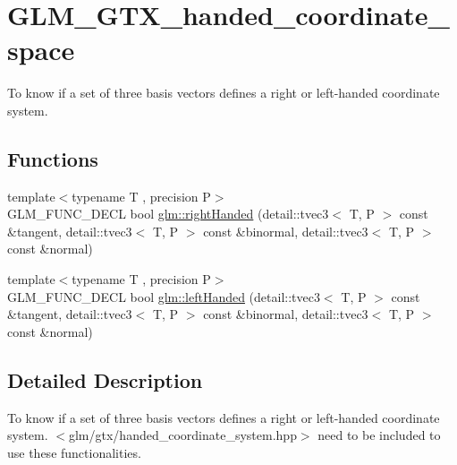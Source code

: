 \hypertarget{group__gtx__handed__coordinate__space}{\section{G\-L\-M\-\_\-\-G\-T\-X\-\_\-handed\-\_\-coordinate\-\_\-space}
\label{group__gtx__handed__coordinate__space}
}


To know if a set of three basis vectors defines a right or left-\/handed coordinate system.  


\subsection*{Functions}
\begin{DoxyCompactItemize}
\item 
{\footnotesize template$<$typename T , precision P$>$ }\\G\-L\-M\-\_\-\-F\-U\-N\-C\-\_\-\-D\-E\-C\-L bool \hyperlink{group__gtx__handed__coordinate__space_ga16517e8a56cba5ba908e6eac6500ab94}{glm\-::right\-Handed} (detail\-::tvec3$<$ T, P $>$ const \&tangent, detail\-::tvec3$<$ T, P $>$ const \&binormal, detail\-::tvec3$<$ T, P $>$ const \&normal)
\item 
{\footnotesize template$<$typename T , precision P$>$ }\\G\-L\-M\-\_\-\-F\-U\-N\-C\-\_\-\-D\-E\-C\-L bool \hyperlink{group__gtx__handed__coordinate__space_ga2c0882af0eabd0e39da5680931f586ed}{glm\-::left\-Handed} (detail\-::tvec3$<$ T, P $>$ const \&tangent, detail\-::tvec3$<$ T, P $>$ const \&binormal, detail\-::tvec3$<$ T, P $>$ const \&normal)
\end{DoxyCompactItemize}


\subsection{Detailed Description}
To know if a set of three basis vectors defines a right or left-\/handed coordinate system. $<$glm/gtx/handed\-\_\-coordinate\-\_\-system.\-hpp$>$ need to be included to use these functionalities. 


